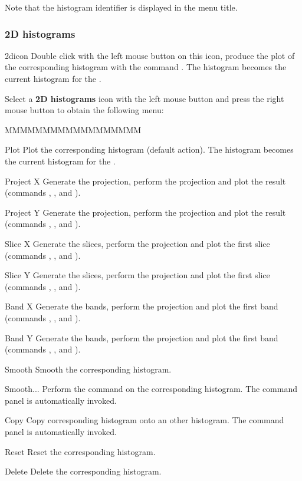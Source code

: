 Note that the histogram identifier is displayed in the menu title.


\subsubsection{2D histograms}
\begin{ICON}{2dicon}
Double click with the left mouse button on this icon, produce the plot of the
corresponding histogram with the command  . The histogram
becomes the current histogram for the \HSP.
\end{ICON}

Select a {\bf 2D histograms} icon with the left mouse button and press
the right mouse button to obtain the following menu:


\begin{DLsf}{MMMMMMMMMMMMMMMMMM}
\item[Plot]         Plot the corresponding histogram (default action). The 
                    histogram becomes the current histogram for the \HSP.
\item[Project X]    Generate the  projection, perform the projection
                    and plot the result (commands , ,
                    and ).
\item[Project Y]    Generate the  projection, perform the projection
                    and plot the result (commands , ,
                    and ).
\item[Slice X]      Generate the  slices, perform the projection
                    and plot the first slice (commands ,
                    , and ).
\item[Slice Y]      Generate the  slices, perform the projection
                    and plot the first slice (commands ,
                    , and ).
\item[Band X]       Generate the  bands, perform the projection
                    and plot the first band (commands ,
                    , and ).
\item[Band Y]       Generate the  bands, perform the projection
                    and plot the first band (commands ,
                    , and ).
\item[Smooth]       Smooth the corresponding histogram.
\item[Smooth...]    Perform the command  on the corresponding
                    histogram. The command panel is automatically invoked.
\item[Copy ]        Copy corresponding histogram onto an other histogram.
                    The command panel is automatically invoked.
\item[Reset ]       Reset the corresponding histogram.
\item[Delete]       Delete the corresponding histogram.
\end{DLsf}

